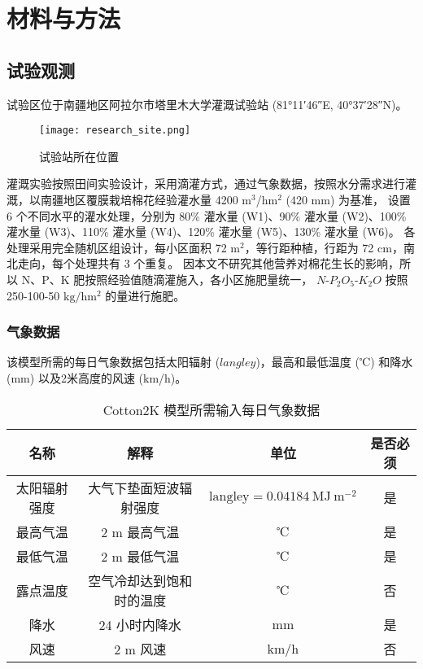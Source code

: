 \chapter{材料与方法}

\section{试验观测}
试验区位于南疆地区阿拉尔市塔里木大学灌溉试验站 (\ang{81;11;46}E, \ang{40;37;28}N)。
\begin{figure}
    \centering
    \texttt{[image: research\_site.png]}
    \caption{试验站所在位置}
\end{figure}
灌溉实验按照田间实验设计，采用滴灌方式，通过气象数据，按照水分需求进行灌溉，以南疆地区覆膜栽培棉花经验灌水量 4200 m$^3$/hm$^2$ (420 mm) 为基准，%
设置 6 个不同水平的灌水处理，分别为 80\% 灌水量 (W1)、90\% 灌水量 (W2)、100\% 灌水量 (W3)、110\% 灌水量 (W4)、120\% 灌水量 (W5)、130\% 灌水量 (W6)。
各处理采用完全随机区组设计，每小区面积 72 m$^2$，等行距种植，行距为 72 cm，南北走向，每个处理共有 3 个重复。
因本文不研究其他营养对棉花生长的影响，所以 N、P、K 肥按照经验值随滴灌施入，各小区施肥量统一，%
$N$-$P_2O_5$-$K_2O$ 按照 250-100-50 $\mathrm{kg/hm^2}$ 的量进行施肥。

\subsection{气象数据}

该模型所需的每日气象数据包括太阳辐射 ($langley$)，最高和最低温度 (℃) 和降水 (mm) 以及2米高度的风速 (km/h)。

\begin{table}
    \caption{Cotton2K 模型所需输入每日气象数据}\label{tab:meteorology}
    \small
    \centering
    \begin{tabular}{cccc}
        \toprule
        名称         & 解释                     & 单位                                              & 是否必须 \\
        \midrule
        太阳辐射强度 & 大气下垫面短波辐射强度   & $\mathrm{langley} = 0.04184\ \mathrm{MJ\ m^{-2}}$ & 是       \\
        最高气温     & 2 m 最高气温             & ℃                                                 & 是       \\
        最低气温     & 2 m 最低气温             & ℃                                                 & 是       \\
        露点温度     & 空气冷却达到饱和时的温度 & ℃                                                 & 否       \\
        降水         & 24 小时内降水            & mm                                                & 是       \\
        风速         & 2 m 风速                 & km/h                                              & 否       \\
        \bottomrule
    \end{tabular}
\end{table}

